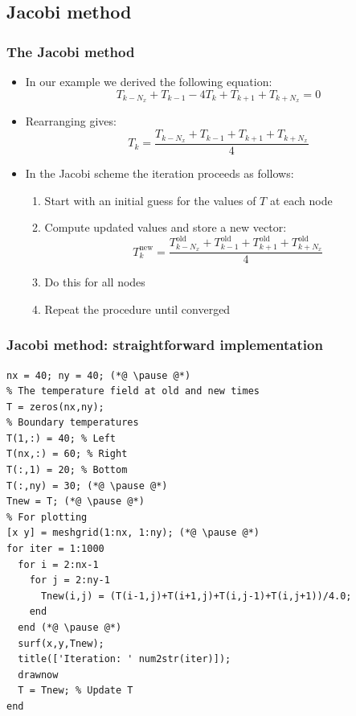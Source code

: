 \documentclass[11pt,table,final,xcolor={usenames,dvipsnames,table}]{beamer}
\begin{document}
\subsection*{Jacobi method}
\begin{frame}[fragile]
  \frametitle{The Jacobi method}
  \begin{itemize}
     \item In our example we derived the following equation:
    \[
     T_{k-N_x} + T_{k-1} - 4T_k + T_{k+1} + T_{k+N_x} = 0
    \]
    \item Rearranging gives:
    \[
      T_k = \frac{T_{k-N_x} + T_{k-1} + T_{k+1} + T_{k+N_x}}{4}
    \]\pause
    \item In the Jacobi scheme the iteration proceeds as follows:
    \begin{enumerate}
      \item Start with an initial guess for the values of $T$ at each node\pause
      \item Compute updated values and store a new vector:
        \[
          T_k^\text{new} = \frac{T_{k-N_x}^\text{old} + T_{k-1}^\text{old} + T_{k+1}^\text{old} + T_{k+N_x}^\text{old}}{4}
        \]\pause
      \item Do this for all nodes\pause
      \item Repeat the procedure until converged
    \end{enumerate}
  \end{itemize}
\end{frame}

\begin{frame}[fragile]
  \frametitle{Jacobi method: straightforward implementation}
  \begin{lstlisting}[basicstyle=\scriptsize\ttfamily]
% Grid size
nx = 40; ny = 40; (*@ \pause @*)
% The temperature field at old and new times
T = zeros(nx,ny);
% Boundary temperatures
T(1,:) = 40; % Left 
T(nx,:) = 60; % Right
T(:,1) = 20; % Bottom
T(:,ny) = 30; (*@ \pause @*)
Tnew = T; (*@ \pause @*)
% For plotting
[x y] = meshgrid(1:nx, 1:ny); (*@ \pause @*)
for iter = 1:1000 
  for i = 2:nx-1
    for j = 2:ny-1 
      Tnew(i,j) = (T(i-1,j)+T(i+1,j)+T(i,j-1)+T(i,j+1))/4.0;
    end
  end (*@ \pause @*)
  surf(x,y,Tnew);
  title(['Iteration: ' num2str(iter)]);
  drawnow
  T = Tnew; % Update T
end
  \end{lstlisting}
\end{frame}
\end{document}

